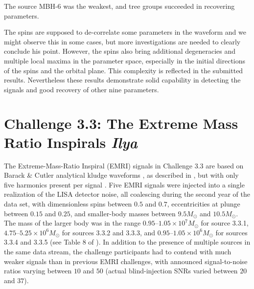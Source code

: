 \documentclass{iopart}
\begin{document}
The source MBH-6 was the weakest, and tree groups succeeded in recovering parameters. 

The spins are supposed to de-correlate some parameters in the waveform \cite{SpinBBHLangHugues} and we 
might observe this in some cases, but more investigations are needed to clearly conclude his point.
However, the spins also bring additional degeneracies and multiple local maxima in the parameter space, especially in the initial directions of the spins and the orbital plane. This complexity is reflected in the submitted results.
Nevertheless these results demonstrate solid capability in detecting the signals and good recovery of other 
nine parameters. 




\section{Challenge 3.3: The Extreme Mass Ratio Inspirals {\it Ilya}}

The Extreme-Mass-Ratio Inspiral (EMRI) signals in Challenge 3.3 are based on Barack \& Cutler analytical kludge waveforms \cite{barackcutler}, as described in \cite{mldcgwdaw2}, but with only five harmonics present per signal \cite{MLDC3}.  Five EMRI signals were injected into a single realization of the LISA detector noise, all coalescing during the second year of the data set, with dimensionless spins between $0.5$ and $0.7$, eccentricities at plunge between $0.15$ and $0.25$, and smaller-body masses between $9.5 M_\odot$ and $10.5 M_\odot$.  The mass of the larger body was in the range $0.95$--$1.05\times10^7 M_\odot$ for source 3.3.1,  $4.75$--$5.25 \times10^6 M_\odot$ for sources 3.3.2 and 3.3.3, and $0.95$--$1.05\times10^6 M_\odot$ for sources 3.3.4 and 3.3.5 (see Table 8 of \cite{MLDC3}).  In addition to the presence of multiple sources in the same data stream, the challenge participants had to contend with much weaker signals than in previous EMRI challenges, with announced signal-to-noise ratios varying between $10$ and $50$ (actual blind-injection SNRs varied between $20$ and $37$).
\end{document}
